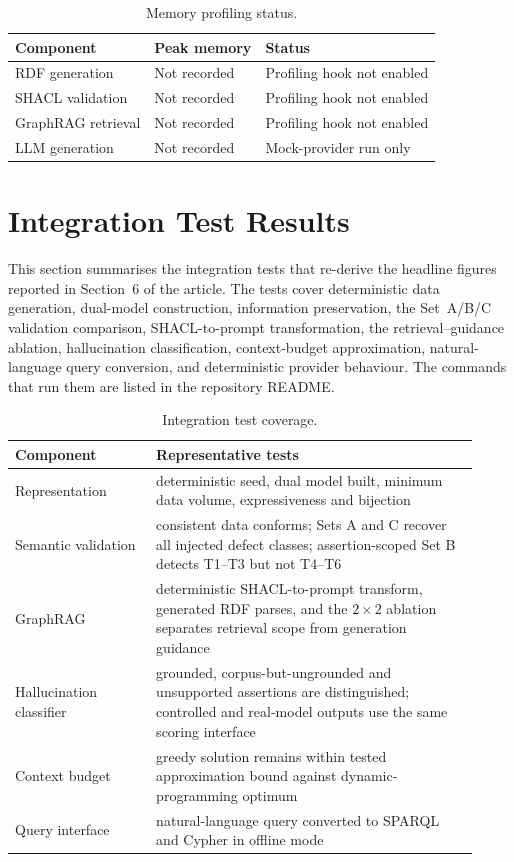\documentclass[10pt,a4paper]{article}
\begin{document}
\begin{table}[H]
\centering
\caption{Memory profiling status.}
\label{tab:memory}
\small
\begin{tabular}{lll}
\toprule
\textbf{Component} & \textbf{Peak memory} & \textbf{Status} \\
\midrule
RDF generation & Not recorded & Profiling hook not enabled \\
SHACL validation & Not recorded & Profiling hook not enabled \\
GraphRAG retrieval & Not recorded & Profiling hook not enabled \\
LLM generation & Not recorded & Mock-provider run only \\
\bottomrule
\end{tabular}
\end{table}

\section{Integration Test Results}
\label{sec:tests}
This section summarises the integration tests that re-derive the headline figures reported in Section~6 of the article. The tests cover deterministic data generation, dual-model construction, information preservation, the Set~A/B/C validation comparison, SHACL-to-prompt transformation, the retrieval--guidance ablation, hallucination classification, context-budget approximation, natural-language query conversion, and deterministic provider behaviour. The commands that run them are listed in the repository README.

\begin{table}[H]
\centering
\caption{Integration test coverage.}
\label{tab:tests}
\small
\begin{tabular}{p{0.28\linewidth}p{0.64\linewidth}}
\toprule
\textbf{Component} & \textbf{Representative tests} \\
\midrule
Representation & deterministic seed, dual model built, minimum data volume, expressiveness and bijection \\
Semantic validation & consistent data conforms; Sets A and C recover all injected defect classes; assertion-scoped Set B detects T1--T3 but not T4--T6 \\
GraphRAG & deterministic SHACL-to-prompt transform, generated RDF parses, and the \(2\times2\) ablation separates retrieval scope from generation guidance \\
Hallucination classifier & grounded, corpus-but-ungrounded and unsupported assertions are distinguished; controlled and real-model outputs use the same scoring interface \\
Context budget & greedy solution remains within tested approximation bound against dynamic-programming optimum \\
Query interface & natural-language query converted to SPARQL and Cypher in offline mode \\
\bottomrule
\end{tabular}
\end{table}
\end{document}
